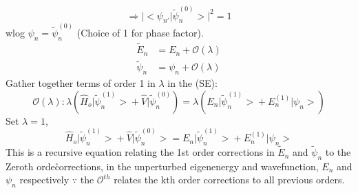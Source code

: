 \documentclass[12pt,fancychapters]{report}
\numberwithin{equation}{section}
\begin{document}
$$\Longrightarrow \big| \big< \psi_{n'} \big| \tilde{\psi}_n^{(0)} \big> \big|^2 = 1$$
wlog $\psi_n = \tilde{\psi}^{(0)}_n$ (Choice of 1 for phase factor).
\begin{align*}
	\tilde{E}_n & = E_n + \mathcal{O}(\lambda)\\
	\tilde{\psi}_n & = \psi_n + \mathcal{O}(\lambda)
\end{align*}
Gather together terms of order 1 in $\lambda$ in the (SE):
\begin{equation*}
	\mathcal{O}(\lambda):\lambda \left( \hat{H}_o \big|\tilde{\psi}^{(1)}_n \big> + 
	\hat{V}\big| \tilde{\psi}^{(0)}_n \right) = 
	\lambda \left(E_n \big|\tilde{\psi}^{(1)}_n \big> + E^{(1)}_n \big|\psi_n \big> \right)
\end{equation*}
Set $\lambda = 1$, 
\begin{equation*}
	\hat{H}_o \big|\tilde{\psi}^{(1)}_n \big> + 
	\hat{V}\big| \tilde{\psi}^{(0)}_n \big> = 
	E_n \big|\tilde{\psi}^{(1)}_n \big> + E^{(1)}_n \big|\psi_n \big> 
\end{equation*}
This is a recursive equation relating the 1st order corrections in $\tilde{E}_n$ and $\tilde{\psi}_n$
to the Zeroth orde\r corrections, in the unperturbed eigenenergy and wavefunction, $E_n$ and $\psi_n$
respectively $\because$ the $\mathcal{O}^{th}$ relates the kth order corrections to all previous orders.
\end{document}
